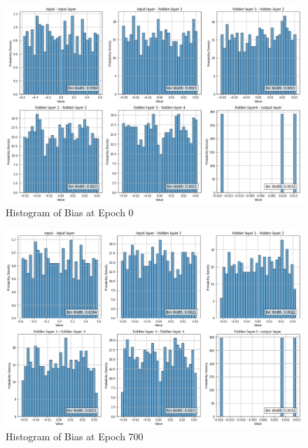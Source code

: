 \documentclass{ioereport}
\begin{document}
    \begin{figure}[H]
        \centering
        \includegraphics[width=\linewidth]{assets/video histogram/epoch0Bias.png}
        \caption{Histogram of Bias at Epoch 0}
        \label{fig:video-bias-0}
    \end{figure}

    \begin{figure}[H]
        \centering
        \includegraphics[width=\linewidth]{assets/video histogram/epoch700Bias.png}
        \caption{Histogram of Bias at Epoch 700}
        \label{fig:video-bias-700}
    \end{figure}
\end{document}
